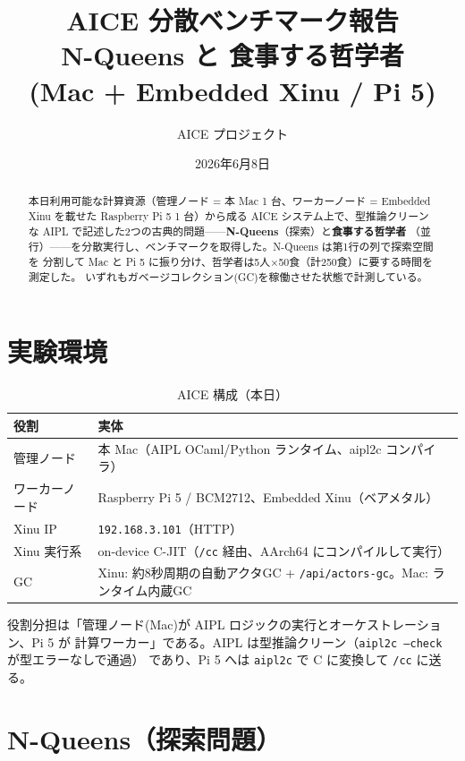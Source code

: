 \documentclass[a4paper,11pt]{ltjsarticle}
\title{\textbf{AICE 分散ベンチマーク報告\\ N-Queens と 食事する哲学者\\ (Mac + Embedded Xinu / Pi 5)}}
\author{AICE プロジェクト}
\date{2026年6月8日}
\newcommand{\cmd}[1]{\texttt{#1}}
\begin{document}
\maketitle

\begin{abstract}
\noindent
本日利用可能な計算資源（管理ノード = 本 Mac 1 台、ワーカーノード = Embedded
Xinu を載せた Raspberry Pi 5 1 台）から成る AICE システム上で、型推論クリーンな
AIPL で記述した2つの古典的問題——\textbf{N-Queens}（探索）と\textbf{食事する哲学者}
（並行）——を分散実行し、ベンチマークを取得した。N-Queens は第1行の列で探索空間を
分割して Mac と Pi 5 に振り分け、哲学者は5人×50食（計250食）に要する時間を測定した。
いずれもガベージコレクション(GC)を稼働させた状態で計測している。
\end{abstract}

\tableofcontents

\section{実験環境}
\begin{table}[h]\centering
\begin{tabular}{ll}
\toprule
役割 & 実体 \\
\midrule
管理ノード & 本 Mac（AIPL OCaml/Python ランタイム、aipl2c コンパイラ）\\
ワーカーノード & Raspberry Pi 5 / BCM2712、Embedded Xinu（ベアメタル）\\
Xinu IP & \texttt{192.168.3.101}（HTTP）\\
Xinu 実行系 & on-device C-JIT（\texttt{/cc} 経由、AArch64 にコンパイルして実行）\\
GC & Xinu: 約8秒周期の自動アクタGC + \texttt{/api/actors-gc}。Mac: ランタイム内蔵GC \\
\bottomrule
\end{tabular}
\caption{AICE 構成（本日）}
\end{table}

\noindent
役割分担は「管理ノード(Mac)が AIPL ロジックの実行とオーケストレーション、Pi 5 が
計算ワーカー」である。AIPL は型推論クリーン（\cmd{aipl2c --check} が型エラーなしで通過）
であり、Pi 5 へは \cmd{aipl2c} で C に変換して \cmd{/cc} に送る。

\section{N-Queens（探索問題）}
\end{document}
